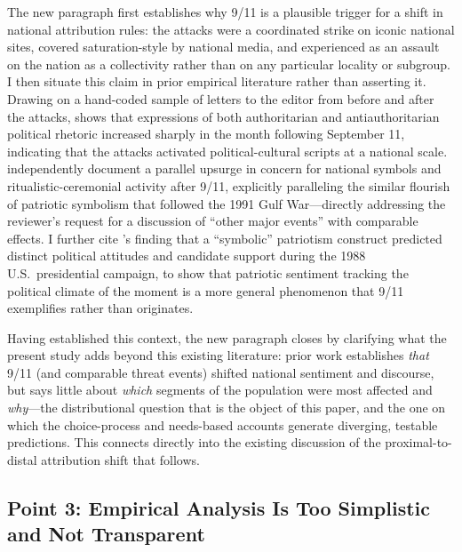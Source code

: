 \documentclass[11pt]{article}
\begin{document}
The new paragraph first establishes why 9/11 is a plausible trigger for a shift in national attribution rules: the attacks were a coordinated strike on iconic national sites, covered saturation-style by national media, and experienced as an assault on the nation as a collectivity rather than on any particular locality or subgroup. I then situate this claim in prior empirical literature rather than asserting it. Drawing on a hand-coded sample of letters to the editor from before and after the attacks, \citet{perrin2005national} shows that expressions of both authoritarian and antiauthoritarian political rhetoric increased sharply in the month following September 11, indicating that the attacks activated political-cultural scripts at a national scale. \citet{schatz2007waving} independently document a parallel upsurge in concern for national symbols and ritualistic-ceremonial activity after 9/11, explicitly paralleling the similar flourish of patriotic symbolism that followed the 1991 Gulf War---directly addressing the reviewer's request for a discussion of ``other major events'' with comparable effects. I further cite \citet{sullivan1992patriotism}'s finding that a ``symbolic'' patriotism construct predicted distinct political attitudes and candidate support during the 1988 U.S.\ presidential campaign, to show that patriotic sentiment tracking the political climate of the moment is a more general phenomenon that 9/11 exemplifies rather than originates.

Having established this context, the new paragraph closes by clarifying what the present study adds beyond this existing literature: prior work establishes \textit{that} 9/11 (and comparable threat events) shifted national sentiment and discourse, but says little about \textit{which} segments of the population were most affected and \textit{why}---the distributional question that is the object of this paper, and the one on which the choice-process and needs-based accounts generate diverging, testable predictions. This connects directly into the existing discussion of the proximal-to-distal attribution shift that follows.

\subsection*{Point 3: Empirical Analysis Is Too Simplistic and Not Transparent}
\end{document}
